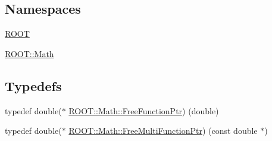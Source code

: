 \subsection*{Namespaces}
\begin{DoxyCompactItemize}
\item 
 \mbox{\hyperlink{namespaceROOT}{R\+O\+OT}}
\item 
 \mbox{\hyperlink{namespaceROOT_1_1Math}{R\+O\+O\+T\+::\+Math}}
\end{DoxyCompactItemize}
\subsection*{Typedefs}
\begin{DoxyCompactItemize}
\item 
typedef double($\ast$ \mbox{\hyperlink{namespaceROOT_1_1Math_a1626176a324764582ff287b704e2a4af}{R\+O\+O\+T\+::\+Math\+::\+Free\+Function\+Ptr}}) (double)
\item 
typedef double($\ast$ \mbox{\hyperlink{namespaceROOT_1_1Math_a8d555820603c5765e2a3959090f0d64d}{R\+O\+O\+T\+::\+Math\+::\+Free\+Multi\+Function\+Ptr}}) (const double $\ast$)
\end{DoxyCompactItemize}
